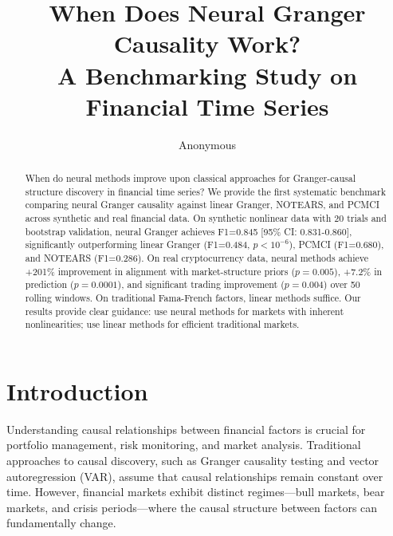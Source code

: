 \documentclass[sigconf,nonacm]{acmart}
\begin{document}
\title{When Does Neural Granger Causality Work? \\ A Benchmarking Study on Financial Time Series}

\author{Anonymous}

\begin{abstract}
When do neural methods improve upon classical approaches for Granger-causal structure discovery in financial time series? We provide the first systematic benchmark comparing neural Granger causality against linear Granger, NOTEARS, and PCMCI across synthetic and real financial data. On synthetic nonlinear data with 20 trials and bootstrap validation, neural Granger achieves F1=0.845 [95\% CI: 0.831-0.860], significantly outperforming linear Granger (F1=0.484, $p<10^{-6}$), PCMCI (F1=0.680), and NOTEARS (F1=0.286). On real cryptocurrency data, neural methods achieve +201\% improvement in alignment with market-structure priors ($p=0.005$), +7.2\% in prediction ($p=0.0001$), and significant trading improvement ($p=0.004$) over 50 rolling windows. On traditional Fama-French factors, linear methods suffice. Our results provide clear guidance: use neural methods for markets with inherent nonlinearities; use linear methods for efficient traditional markets.
\end{abstract}


\maketitle

\section{Introduction}

Understanding causal relationships between financial factors is crucial for portfolio management, risk monitoring, and market analysis. Traditional approaches to causal discovery, such as Granger causality testing \cite{granger1969investigating} and vector autoregression (VAR), assume that causal relationships remain constant over time. However, financial markets exhibit distinct regimes---bull markets, bear markets, and crisis periods---where the causal structure between factors can fundamentally change.
\end{document}
